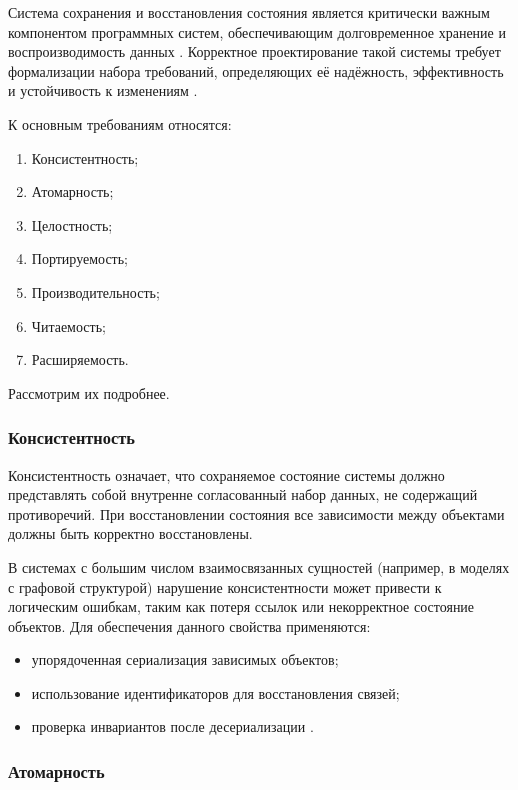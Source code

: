\documentclass[coursework]{SCWorks}
\begin{document}
Система сохранения и восстановления состояния является критически важным компонентом программных систем, обеспечивающим долговременное хранение и воспроизводимость данных . Корректное проектирование такой системы требует формализации набора требований, определяющих её надёжность, эффективность и устойчивость к изменениям \cite{kleppmann2017designing, soukup1994serialization}.

К основным требованиям относятся:
\begin{enumerate}
    \item Консистентность;
    \item Атомарность;
    \item Целостность;
    \item Портируемость;
    \item Производительность;
    \item Читаемость;
    \item Расширяемость.
\end{enumerate}
Рассмотрим их подробнее.

\subsubsection{Консистентность}

Консистентность означает, что сохраняемое состояние системы должно представлять собой внутренне согласованный набор данных, не содержащий противоречий. При восстановлении состояния все зависимости между объектами должны быть корректно восстановлены.

В системах с большим числом взаимосвязанных сущностей (например, в моделях с графовой структурой) нарушение консистентности может привести к логическим ошибкам, таким как потеря ссылок или некорректное состояние объектов. Для обеспечения данного свойства применяются:
\begin{itemize}
    \item упорядоченная сериализация зависимых объектов;
    \item использование идентификаторов для восстановления связей;
    \item проверка инвариантов после десериализации \cite{silberschatz2020database, ramakrishnan2003database}.
\end{itemize}


\subsubsection{Атомарность}
\end{document}
